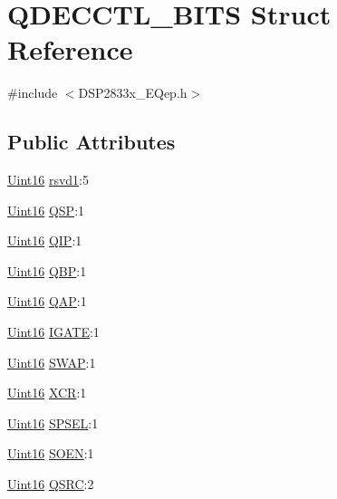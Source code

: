 \hypertarget{struct_q_d_e_c_c_t_l___b_i_t_s}{}\section{Q\+D\+E\+C\+C\+T\+L\+\_\+\+B\+I\+T\+S Struct Reference}
\label{struct_q_d_e_c_c_t_l___b_i_t_s}


{\ttfamily \#include $<$D\+S\+P2833x\+\_\+\+E\+Qep.\+h$>$}

\subsection*{Public Attributes}
\begin{DoxyCompactItemize}
\item 
\hyperlink{_d_s_p2833x___device_8h_a59a9f6be4562c327cbfb4f7e8e18f08b}{Uint16} \hyperlink{struct_q_d_e_c_c_t_l___b_i_t_s_afd73bd12adcf4b18d584885a1fb7c2e7}{rsvd1}\+:5
\item 
\hyperlink{_d_s_p2833x___device_8h_a59a9f6be4562c327cbfb4f7e8e18f08b}{Uint16} \hyperlink{struct_q_d_e_c_c_t_l___b_i_t_s_a799c720eaf17f45b24f1c44d5be1a783}{Q\+S\+P}\+:1
\item 
\hyperlink{_d_s_p2833x___device_8h_a59a9f6be4562c327cbfb4f7e8e18f08b}{Uint16} \hyperlink{struct_q_d_e_c_c_t_l___b_i_t_s_a9eb0feb288441e49f7656687a00814d8}{Q\+I\+P}\+:1
\item 
\hyperlink{_d_s_p2833x___device_8h_a59a9f6be4562c327cbfb4f7e8e18f08b}{Uint16} \hyperlink{struct_q_d_e_c_c_t_l___b_i_t_s_a1994b2d25235e7b50837d76706ac73a7}{Q\+B\+P}\+:1
\item 
\hyperlink{_d_s_p2833x___device_8h_a59a9f6be4562c327cbfb4f7e8e18f08b}{Uint16} \hyperlink{struct_q_d_e_c_c_t_l___b_i_t_s_a8afbe26800042c0875f18c59a046a866}{Q\+A\+P}\+:1
\item 
\hyperlink{_d_s_p2833x___device_8h_a59a9f6be4562c327cbfb4f7e8e18f08b}{Uint16} \hyperlink{struct_q_d_e_c_c_t_l___b_i_t_s_ac0990cb75f902af701cb3ee14dbce622}{I\+G\+A\+T\+E}\+:1
\item 
\hyperlink{_d_s_p2833x___device_8h_a59a9f6be4562c327cbfb4f7e8e18f08b}{Uint16} \hyperlink{struct_q_d_e_c_c_t_l___b_i_t_s_afbee23e2adcbb23eb9737bab27009079}{S\+W\+A\+P}\+:1
\item 
\hyperlink{_d_s_p2833x___device_8h_a59a9f6be4562c327cbfb4f7e8e18f08b}{Uint16} \hyperlink{struct_q_d_e_c_c_t_l___b_i_t_s_a967c7f00af9183a5a04fe7e656dfe07e}{X\+C\+R}\+:1
\item 
\hyperlink{_d_s_p2833x___device_8h_a59a9f6be4562c327cbfb4f7e8e18f08b}{Uint16} \hyperlink{struct_q_d_e_c_c_t_l___b_i_t_s_a9938cddc3c8102a2c8dc4073ab5ce99e}{S\+P\+S\+E\+L}\+:1
\item 
\hyperlink{_d_s_p2833x___device_8h_a59a9f6be4562c327cbfb4f7e8e18f08b}{Uint16} \hyperlink{struct_q_d_e_c_c_t_l___b_i_t_s_afd175aa2a3f870744f2d39799722534f}{S\+O\+E\+N}\+:1
\item 
\hyperlink{_d_s_p2833x___device_8h_a59a9f6be4562c327cbfb4f7e8e18f08b}{Uint16} \hyperlink{struct_q_d_e_c_c_t_l___b_i_t_s_ad5190ac78a47c65d33d9fbd5dd6815fe}{Q\+S\+R\+C}\+:2
\end{DoxyCompactItemize}


